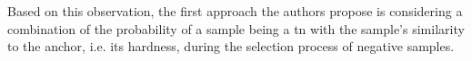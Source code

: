 Based on this observation, the first approach the authors propose is 
considering a combination of the probability of a sample being a \ac{tn} 
with the sample's similarity to the anchor, i.e. its hardness, during the selection process of negative samples.




